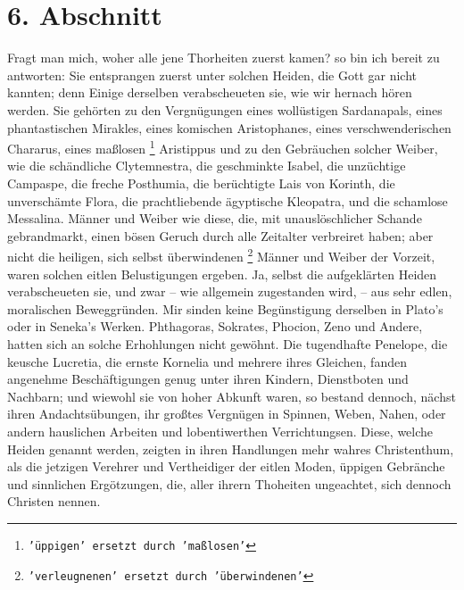 \section{6. Abschnitt} \label{kap17_ab6}

Fragt man mich, woher alle jene Thorheiten zuerst kamen? so bin ich bereit zu
antworten: Sie entsprangen zuerst unter solchen Heiden, die Gott gar nicht
kannten; denn Einige derselben verabscheueten sie, wie wir hernach hören werden.
Sie gehörten zu den Vergnügungen eines wollüstigen
Sardanapals, eines
phantastischen Mirakles, eines komischen
Aristophanes, eines verschwenderischen
Chararus, eines maßlosen
\footnote{\texttt{'üppigen' ersetzt durch 'maßlosen'}}
Aristippus und zu den Gebräuchen solcher Weiber, wie
die
schändliche Clytemnestra, die geschminkte
Isabel, die unzüchtige
Campaspe, die
freche Posthumia, die berüchtigte Lais von
Korinth, die unverschämte Flora, die
prachtliebende ägyptische Kleopatra, und die schamlose
Messalina. Männer und
Weiber wie diese, die, mit unauslöschlicher Schande gebrandmarkt, einen bösen
Geruch durch alle Zeitalter verbreiret haben; aber nicht die heiligen, sich
selbst überwindenen
\footnote{\texttt{'verleugnenen' ersetzt durch 'überwindenen'}} Männer und
Weiber der Vorzeit, waren solchen eitlen
Belustigungen ergeben. Ja, selbst die aufgeklärten
Heiden verabscheueten sie,
und zwar -- wie allgemein zugestanden wird, -- aus sehr edlen, moralischen
Beweggründen. Mir sinden keine Begünstigung derselben in
Plato’s oder in
Seneka's Werken. Phthagoras,
Sokrates, Phocion,
Zeno und Andere, hatten sich an
solche Erhohlungen nicht gewöhnt. Die tugendhafte
Penelope, die keusche
Lucretia, die ernste
Kornelia und mehrere ihres Gleichen, fanden angenehme
Beschäftigungen genug unter ihren Kindern, Dienstboten und Nachbarn; und wiewohl
sie von hoher Abkunft waren, so bestand dennoch, nächst ihren Andachtsübungen,
ihr großtes Vergnügen in Spinnen, Weben, Nahen, oder andern hauslichen Arbeiten
und lobentiwerthen Verrichtungsen. Diese, welche Heiden genannt werden, zeigten
in ihren Handlungen mehr wahres Christenthum, als die jetzigen Verehrer und
Vertheidiger der eitlen Moden, üppigen Gebränche und sinnlichen Ergötzungen,
die, aller ihrern Thoheiten ungeachtet, sich dennoch Christen nennen.

